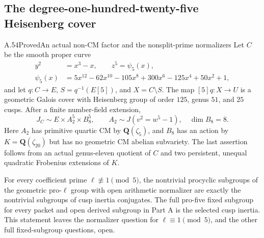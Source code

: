 \subsection{The degree-one-hundred-twenty-five Heisenberg cover}

\begin{statement}{A.54}{Proved}{An actual non-CM factor and the nonsplit-prime normalizers}
Let \(C\) be the smooth proper curve
\[
 \begin{aligned}
 y^2&=x^3-x,\qquad z^5=\psi _5(x),\\
 \psi _5(x)&=5x^{12}-62x^{10}-105x^8+300x^6-125x^4+50x^2+1,
 \end{aligned}
                                                               \tag{A.54.1}
\]
and let \(q:C\to E\), \(S=q^{-1}(E[5])\), and \(X=C\setminus S\).
The map \([5]q:X\to U\) is a geometric Galois cover
with Heisenberg group of order \(125\), genus \(51\), and \(25\) cusps.
After a finite number-field extension,
\[
 J_C\sim E\times A_2^5\times B_8^5,\qquad
 A_2\sim J(v^2=w^5-1),\quad \dim B_8=8.             \tag{A.54.2}
\]
Here \(A_2\) has primitive quartic CM by \(\mathbf Q(\zeta _5)\),
and \(B_8\) has an action by \(K=\mathbf Q(\zeta _{20})\)
but has no geometric CM abelian subvariety.
The last assertion follows from an actual genus-eleven quotient of \(C\)
and two persistent, unequal quadratic Frobenius extensions of \(K\).

For every coefficient prime \(\ell\not\equiv1\pmod5\),
the nontrivial procyclic subgroups of the geometric pro-\(\ell\) group
with open arithmetic normalizer are exactly the nontrivial subgroups
of cusp inertia conjugates. The full pro-five fixed subgroup for every
packet and open derived subgroup in Part A is the selected cusp inertia.
This statement leaves the normalizer question for \(\ell\equiv1\pmod5\),
and the other full fixed-subgroup questions, open.
\end{statement}

